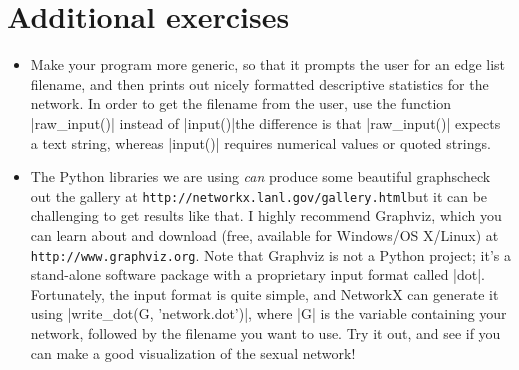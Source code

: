 \documentclass{article}
\begin{document}
\section*{Additional exercises}
\begin{itemize}
 \item Make your program more generic, so that it prompts the user for an edge list filename, and then prints out nicely formatted descriptive statistics for
the network.  In order to get the filename from the user, use the function |raw_input()| instead of |input()|\textemdash the difference is that
|raw_input()| expects a text string, whereas |input()| requires numerical values or quoted strings.
 \item The Python libraries we are using \textit{can} produce some beautiful graphs\textemdash check out the gallery at 
\texttt{http://networkx.lanl.gov/gallery.html}\textemdash but it can be challenging to get results like that.  I highly recommend Graphviz, 
which you can learn about and download (free, available for Windows/OS X/Linux) at \texttt{http://www.graphviz.org}.  Note that Graphviz
is not a Python project; it's a stand-alone software package with a proprietary input format called |dot|.  Fortunately, the input format is quite simple,
and NetworkX can generate it using |write_dot(G, 'network.dot')|, where |G| is the variable containing your network, followed by the filename you want
to use.  Try it out, and see if you can make a good visualization of the sexual network!
\end{itemize}
\end{document}

